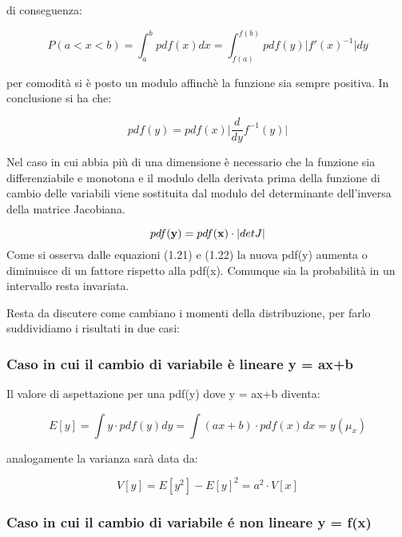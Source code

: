 \documentclass[11pt,a4paper]{book}
\begin{document}
di conseguenza:

\begin{equation*}
	P(a < x< b) = \int_{a}^{b}{pdf(x)dx} = \int_{f(a)}^{f(b)}{pdf(y)\vert f'(x)^{-1}\vert dy}
\end{equation*}

per comodit\`{a} si \`{e} posto un modulo affinch\`{e} la funzione sia sempre positiva. In conclusione si ha che:

\begin{equation}
	pdf(y) = pdf(x)\vert \dfrac{d}{dy}f^{-1}(y) \vert
\end{equation}
 
 Nel caso in cui abbia pi\`{u} di una dimensione \`{e} necessario che la funzione sia differenziabile e monotona e il modulo della derivata prima della funzione di cambio delle variabili viene sostituita dal modulo del determinante dell'inversa della matrice Jacobiana.
 
 \begin{equation}
 	pdf(\bold{y}) = pdf(\bold{x}) \cdot \vert detJ \vert
 \end{equation}
\newline
\noindent Come si osserva dalle equazioni (1.21) e (1.22) la nuova pdf(y) aumenta o diminuisce di un fattore rispetto alla pdf(x). Comunque sia la probabilit\`{a} in un intervallo resta invariata.

Resta da discutere come cambiano i momenti della distribuzione, per farlo suddividiamo i risultati in due casi:

\subsubsection{Caso in cui il cambio di variabile \`{e} lineare y = ax+b}

Il valore di aspettazione per una pdf(y) dove y = ax+b diventa:

\begin{equation}
	E[y] = \int{y\cdot pdf(y)dy} = \int{(ax+b) \cdot pdf(x)dx = y(\mu_x)}
\end{equation}
 
 analogamente la varianza sar\`{a} data da:
 
 \begin{equation}
 	V[y] = E[y^2] - E[y]^2 = a^2 \cdot V[x]
 \end{equation}

 \subsubsection{Caso in cui il cambio di variabile \'{e} non lineare y = f(x)}
 
\end{document}
